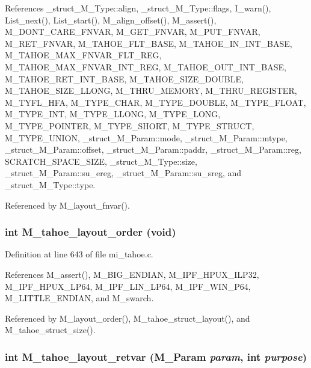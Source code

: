 References \_\-struct\_\-M\_\-Type::align, \_\-struct\_\-M\_\-Type::flags, I\_\-warn(), List\_\-next(), List\_\-start(), M\_\-align\_\-offset(), M\_\-assert(), M\_\-DONT\_\-CARE\_\-FNVAR, M\_\-GET\_\-FNVAR, M\_\-PUT\_\-FNVAR, M\_\-RET\_\-FNVAR, M\_\-TAHOE\_\-FLT\_\-BASE, M\_\-TAHOE\_\-IN\_\-INT\_\-BASE, M\_\-TAHOE\_\-MAX\_\-FNVAR\_\-FLT\_\-REG, M\_\-TAHOE\_\-MAX\_\-FNVAR\_\-INT\_\-REG, M\_\-TAHOE\_\-OUT\_\-INT\_\-BASE, M\_\-TAHOE\_\-RET\_\-INT\_\-BASE, M\_\-TAHOE\_\-SIZE\_\-DOUBLE, M\_\-TAHOE\_\-SIZE\_\-LLONG, M\_\-THRU\_\-MEMORY, M\_\-THRU\_\-REGISTER, M\_\-TYFL\_\-HFA, M\_\-TYPE\_\-CHAR, M\_\-TYPE\_\-DOUBLE, M\_\-TYPE\_\-FLOAT, M\_\-TYPE\_\-INT, M\_\-TYPE\_\-LLONG, M\_\-TYPE\_\-LONG, M\_\-TYPE\_\-POINTER, M\_\-TYPE\_\-SHORT, M\_\-TYPE\_\-STRUCT, M\_\-TYPE\_\-UNION, \_\-struct\_\-M\_\-Param::mode, \_\-struct\_\-M\_\-Param::mtype, \_\-struct\_\-M\_\-Param::offset, \_\-struct\_\-M\_\-Param::paddr, \_\-struct\_\-M\_\-Param::reg, SCRATCH\_\-SPACE\_\-SIZE, \_\-struct\_\-M\_\-Type::size, \_\-struct\_\-M\_\-Param::su\_\-ereg, \_\-struct\_\-M\_\-Param::su\_\-sreg, and \_\-struct\_\-M\_\-Type::type.

Referenced by M\_\-layout\_\-fnvar().
\subsubsection{\setlength{\rightskip}{0pt plus 5cm}int M\_\-tahoe\_\-layout\_\-order (void)}\label{mi__tahoe_8c_0fd8e321e9349bd76e6174982b5a4817}




Definition at line 643 of file mi\_\-tahoe.c.

References M\_\-assert(), M\_\-BIG\_\-ENDIAN, M\_\-IPF\_\-HPUX\_\-ILP32, M\_\-IPF\_\-HPUX\_\-LP64, M\_\-IPF\_\-LIN\_\-LP64, M\_\-IPF\_\-WIN\_\-P64, M\_\-LITTLE\_\-ENDIAN, and M\_\-swarch.

Referenced by M\_\-layout\_\-order(), M\_\-tahoe\_\-struct\_\-layout(), and M\_\-tahoe\_\-struct\_\-size().
\subsubsection{\setlength{\rightskip}{0pt plus 5cm}int M\_\-tahoe\_\-layout\_\-retvar (\bf{M\_\-Param} {\em param}, int {\em purpose})}\label{mi__tahoe_8c_966af636704e0a28c519bce1e12aaeae}




